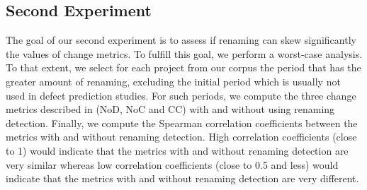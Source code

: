 \subsection{Second Experiment}

The goal of our second experiment is to assess if renaming can skew significantly the values of change metrics. To fulfill this goal, we perform a worst-case analysis. To that extent, we select for each project from our corpus the period that has the greater amount of renaming, excluding the initial period which is usually not used in defect prediction studies. For such periods, we compute the three change metrics described in  (NoD, NoC and CC) with and without using renaming detection. Finally, we compute the Spearman correlation coefficients between the metrics with and without renaming detection. High correlation coefficients (close to 1) would indicate that the metrics with and without renaming detection are very similar whereas low correlation coefficients (close to 0.5 and less) would indicate that the metrics with and without renaming detection are very different.
